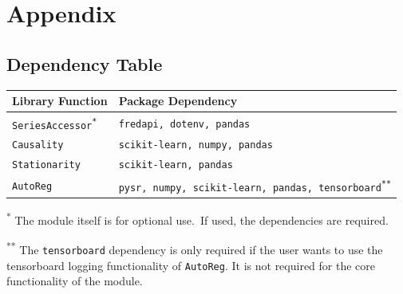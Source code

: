 
\section{Appendix}\label{sec:appendix}
\subsection{Dependency Table}\label{subsec:core-module-dependencies}
\begin{tabular}{ |m{2in}|m{3in}| }
    \hline
    \centering\arraybackslash\textbf{Library Function} & \centering\arraybackslash\textbf{Package Dependency} \\
    \hline
    \texttt{SeriesAccessor\textsuperscript{*}} & \texttt{fredapi, dotenv, pandas} \\
    \hline
    \texttt{Causality} & \texttt{scikit-learn, numpy, pandas} \\
    \hline
    \texttt{Stationarity} & \texttt{scikit-learn, pandas} \\
    \hline
    \texttt{AutoReg} & \texttt{pysr, numpy, scikit-learn, pandas, tensorboard\textsuperscript{**}} \\
    \hline
\end{tabular}

\vspace{1em}
\footnotesize\noindent\textsuperscript{*} The module itself is for optional use.\ If used, the dependencies are required.

\vspace{1em}
\footnotesize\noindent\textsuperscript{**} The \texttt{tensorboard} dependency is only required if the user wants to use the tensorboard logging functionality of \texttt{AutoReg}. It is not required for the core functionality of the module.
